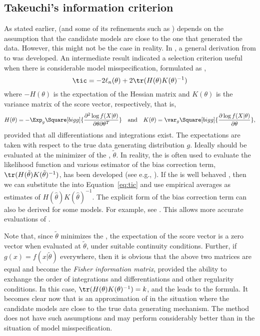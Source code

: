 \subsection{Takeuchi's information criterion}
\label{sub:Takeuchi's information criterion}

As stated earlier, \aic (and some of its refinements such as \aicc) depends
on the assumption that the candidate models are close to the one that
generated the data. However, this might not be the case in reality. In
\cite{Takeuchi:1976vx}, a general derivation from \kld to \aic was developed.
An intermediate result indicated a selection criterion useful when there is
considerable model misspecification, formulated as \tic,
\begin{equation}
  \tic = -2\ell_n(\theta) + 2\tr(H(\theta)K(\theta)^{-1})
  \label{eq:tic}
\end{equation}
where $-H(\theta)$ is the expectation of the Hessian matrix and $K(\theta)$
is the variance matrix of the score vector, respectively, that is,
\begin{equation}
  H(\theta) = -\Exp_g\Square[bigg]{
    \frac{\partial^2\log f(X|\theta)}{\partial\theta\partial\theta^T}
  }\quad\text{and}\quad
  K(\theta) = \var_g\Square[bigg]{
    \frac{\partial\log f(X|\theta)}{\partial\theta}
  },
\end{equation}
provided that all differentiations and integrations exist. The expectations
are taken with respect to the true data generating distribution $g$. Ideally
\tic should be evaluated at the minimizer of the \kld, $\tilde\theta$. In
reality, the \mle is often used to evaluate the likelihood function and
various estimator of the bias correction term,
$\tr(H(\tilde\theta)K(\tilde\theta)^{-1})$, has been developed (see e.g.,
\cite{Claeskens:2008tq}). If the \mle is well behaved \cite{Lehmann:1983vx},
then we can substitute the \mle into Equation~\eqref{eq:tic} and use
empirical averages as estimates of $H(\hat\theta)K(\hat\theta)^{-1}$. The
explicit form of the bias correction term can also be derived for some
models. For example, see \cite[][sec.~6.6]{Burnham:2002wc}. This allows more
accurate evaluations of \tic.

Note that, since $\tilde\theta$ minimizes the \kld, the expectation of the
score vector is a zero vector when evaluated at $\tilde\theta$, under
suitable continuity conditions. Further, if $g(x) = f(x|\tilde\theta)$
everywhere, then it is obvious that the above two matrices are equal and
become the \emph{Fisher information matrix}, provided the ability to exchange
the order of integrations and differentiations and other regularity
conditions. In this case, $\tr(H(\theta)K(\theta)^{-1}) = k$, and the \tic
leads to the \aic formula. It becomes clear now that \aic is an approximation
of \tic in the situation where the candidate models are close to the true
data generating mechanism. The \tic method does not have such assumptions and
may perform considerably better than \aic in the situation of model
misspecification.

